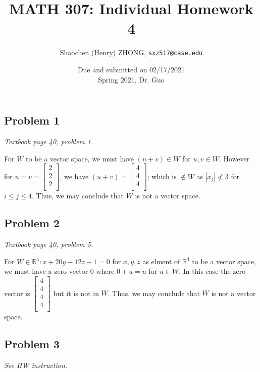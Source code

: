 \documentclass[11pt]{article}
\newcommand{\ilc}{\texttt}
\begin{document}
\title{\textbf{MATH 307: Individual Homework 4}}


\author{Shaochen (Henry) ZHONG, \ilc{sxz517@case.edu}}

\date{Due and submitted on 02/17/2021 \\ Spring 2021, Dr. Guo}
\maketitle

\subsection*{Problem 1}
\textit{Textbook page 40, problem 1.}\newline

For $W$ to be a vector space, we must have $(u + v) \in W$ for $u, v \in W$. However for $u = v = \begin{bmatrix} 2\\ 2\\ 2\\ \end{bmatrix}$, we have $(u + v) = \begin{bmatrix} 4\\ 4\\ 4\\ \end{bmatrix}$; which is $\not\in W$ as $|x_j| \not< 3$ for $i \leq j \leq 4$. Thus, we may conclude that $W$ is not a vector space.


\subsection*{Problem 2}
\textit{Textbook page 40, problem 5.}\newline

For $W \in \mathbb{R}^4: x + 20y - 12z - 1 = 0$ for $x, y, z$ as elment of $\mathbb{R}^4$ to be a vector space, we must have a zero vector $0$ where $0 + u = u$ for $u \in W$. In this case the zero vector is $\begin{bmatrix} 4\\ 4\\ 4\\ 4\\ \end{bmatrix}$ but it is not in $W$. Thus, we may conclude that $W$ is not a vector space.


\subsection*{Problem 3}
\textit{See HW instruction.}\newline
\end{document}
